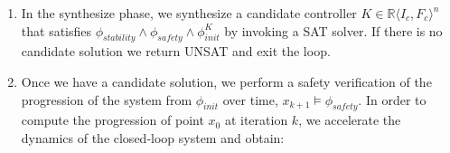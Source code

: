 \documentclass[runningheads,a4paper]{llncs}
\newcommand{\mat}[1]{\boldsymbol{#1}}
\begin{document}
\begin{enumerate}
\begin{enumerate}
\end{enumerate}
\item In the {\sc synthesize} phase, we synthesize a candidate controller
  $K \in \mathbb{R}\langle I_c,F_c\rangle^n$ that satisfies
  $\phi_{stability} \wedge \phi_{safety} \wedge \phi_{init}^{K}$ by invoking a SAT solver.
If there is no candidate solution we return UNSAT and exit the loop.
\item Once we have a candidate solution, we perform a safety verification %
  of the 
  progression of the system from $\phi_{init}$ over time,
$x_{k+1} \models \phi_{safety}$. %
  In order to compute the progression of point $x_0$ at iteration $k$,
  we accelerate the dynamics of the closed-loop system and obtain:

\end{enumerate}
\end{document}
